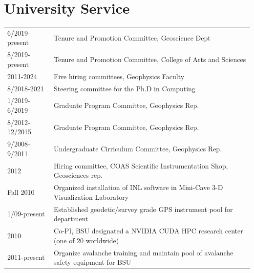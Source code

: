 \documentclass[11pt]{article}
\renewcommand\arraystretch{1}
\begin{document}
\section*{University Service}
\begingroup
\renewcommand\arraystretch{0.7}
\begin{longtable}{p{1.2in}|p{5.7in}}
6/2019-present & Tenure and Promotion Committee, Geoscience Dept \\
8/2019-present & Tenure and Promotion Committee, College of Arts and Sciences \\
2011-2024 & Five hiring committees, Geophysics Faculty \\ 
8/2018-2021 & Steering committee for the Ph.D in Computing \\
1/2019-6/2019 & Graduate Program Committee, Geophysics Rep. \\
8/2012-12/2015 & Graduate Program Committee, Geophysics Rep. \\
9/2008-9/2011 & Undergraduate Cirriculum Committee, Geophysics Rep. \\
2012 & Hiring committee, COAS Scientific Instrumentation Shop, Geosciences rep. \\
Fall 2010 & Organized installation of INL software in Mini-Cave 3-D Visualization Laboratory \\
1/09-present & Established geodetic/survey grade GPS instrument pool for department \\
2010 & Co-PI, BSU designated a NVIDIA CUDA HPC research center (one of 20 worldwide)  \\
2011-present & Organize avalanche training and maintain pool of avalanche safety equipment for BSU \\ 
\end{longtable}
\endgroup
\end{document}

